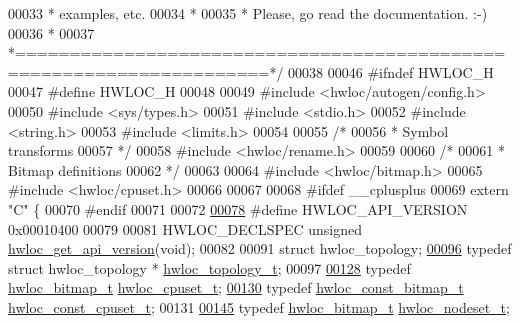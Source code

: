 \begin{DoxyCode}
00033 \textcolor{comment}{ * examples, etc.}
00034 \textcolor{comment}{ *}
00035 \textcolor{comment}{ * Please, go read the documentation.  :-)}
00036 \textcolor{comment}{ *}
00037 \textcolor{comment}{ *=====================================================================*/}
00038 
00046 \textcolor{preprocessor}{#ifndef HWLOC\_H}
00047 \textcolor{preprocessor}{}\textcolor{preprocessor}{#define HWLOC\_H}
00048 \textcolor{preprocessor}{}
00049 \textcolor{preprocessor}{#include <hwloc/autogen/config.h>}
00050 \textcolor{preprocessor}{#include <sys/types.h>}
00051 \textcolor{preprocessor}{#include <stdio.h>}
00052 \textcolor{preprocessor}{#include <string.h>}
00053 \textcolor{preprocessor}{#include <limits.h>}
00054 
00055 \textcolor{comment}{/*}
00056 \textcolor{comment}{ * Symbol transforms}
00057 \textcolor{comment}{ */}
00058 \textcolor{preprocessor}{#include <hwloc/rename.h>}
00059 
00060 \textcolor{comment}{/*}
00061 \textcolor{comment}{ * Bitmap definitions}
00062 \textcolor{comment}{ */}
00063 
00064 \textcolor{preprocessor}{#include <hwloc/bitmap.h>}
00065 \textcolor{preprocessor}{#include <hwloc/cpuset.h>}
00066 
00067 
00068 \textcolor{preprocessor}{#ifdef \_\_cplusplus}
00069 \textcolor{preprocessor}{}\textcolor{keyword}{extern} \textcolor{stringliteral}{"C"} \{
00070 \textcolor{preprocessor}{#endif}
00071 \textcolor{preprocessor}{}
00072 
\hypertarget{a00033_source_l00078}{}\hyperlink{a00038_ga8f4dfb8eef138af55dd1a0fa802e5476}{00078} \textcolor{preprocessor}{#define HWLOC\_API\_VERSION 0x00010400}
00079 \textcolor{preprocessor}{}
00081 HWLOC\_DECLSPEC \textcolor{keywordtype}{unsigned} \hyperlink{a00038_ga61ef7566efe550d314b0ce4f3421ec5d}{hwloc_get_api_version}(\textcolor{keywordtype}{void});
00082 
00091 \textcolor{keyword}{struct }hwloc\_topology;
\hypertarget{a00033_source_l00096}{}\hyperlink{a00039_ga9d1e76ee15a7dee158b786c30b6a6e38}{00096} \textcolor{keyword}{typedef} \textcolor{keyword}{struct }hwloc\_topology * \hyperlink{a00039_ga9d1e76ee15a7dee158b786c30b6a6e38}{hwloc_topology_t};
00097 
\hypertarget{a00033_source_l00128}{}\hyperlink{a00040_ga4bbf39b68b6f568fb92739e7c0ea7801}{00128} \textcolor{keyword}{typedef} \hyperlink{a00065_gaa3c2bf4c776d603dcebbb61b0c923d84}{hwloc_bitmap_t} \hyperlink{a00040_ga4bbf39b68b6f568fb92739e7c0ea7801}{hwloc_cpuset_t};
\hypertarget{a00033_source_l00130}{}\hyperlink{a00040_ga1f784433e9b606261f62d1134f6a3b25}{00130} \textcolor{keyword}{typedef} \hyperlink{a00065_ga2fb1bbc8aea1ea22dee2f0fd39659f48}{hwloc_const_bitmap_t} \hyperlink{a00040_ga1f784433e9b606261f62d1134f6a3b25}{hwloc_const_cpuset_t};
00131 
\hypertarget{a00033_source_l00145}{}\hyperlink{a00040_ga37e35730fa7e775b5bb0afe893d6d508}{00145} \textcolor{keyword}{typedef} \hyperlink{a00065_gaa3c2bf4c776d603dcebbb61b0c923d84}{hwloc_bitmap_t} \hyperlink{a00040_ga37e35730fa7e775b5bb0afe893d6d508}{hwloc_nodeset_t};

\end{DoxyCode}
